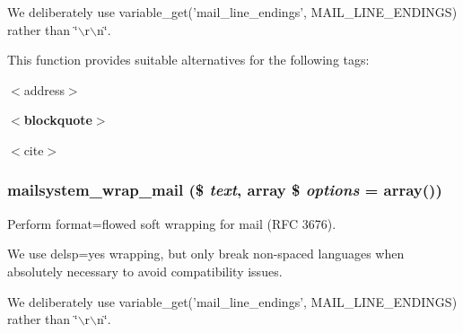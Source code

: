 We deliberately use variable\_\-get('mail\_\-line\_\-endings', MAIL\_\-LINE\_\-ENDINGS) rather than \char`\"{}$\backslash$r$\backslash$n\char`\"{}.

This function provides suitable alternatives for the following tags:

$<$address$>$ {\bfseries  $<$blockquote$>$ \par
  $<$cite$>$   
\begin{DoxyDescription}
\item[{\itshape         {\itshape      {\bfseries           The following tag attributes are supported:: Hyperlink destination urls.: Ordered list item numbers.: Ordered list start number.   \$string The string to be transformed.  \$allowed\_\-tags (optional) If supplied, a list of tags that will be transformed. If omitted, all supported tags are transformed.   The transformed string.   \hyperlink{mail_8inc_ab80781fd7273975a77cbbd13300eddbf}{drupal\_\-mail()} }\/}\/}]
\end{DoxyDescription}}\hypertarget{html__to__text_8inc_a7137e9a046abb0bc57ad54a580612474}{
\subsubsection[{mailsystem\_\-wrap\_\-mail}]{\setlength{\rightskip}{0pt plus 5cm}mailsystem\_\-wrap\_\-mail (\$ {\em text}, \/  array \$ {\em options} = {\ttfamily array()})}}
\label{html__to__text_8inc_a7137e9a046abb0bc57ad54a580612474}
Perform format=flowed soft wrapping for mail (RFC 3676).

We use delsp=yes wrapping, but only break non-\/spaced languages when absolutely necessary to avoid compatibility issues.

We deliberately use variable\_\-get('mail\_\-line\_\-endings', MAIL\_\-LINE\_\-ENDINGS) rather than \char`\"{}$\backslash$r$\backslash$n\char`\"{}.


